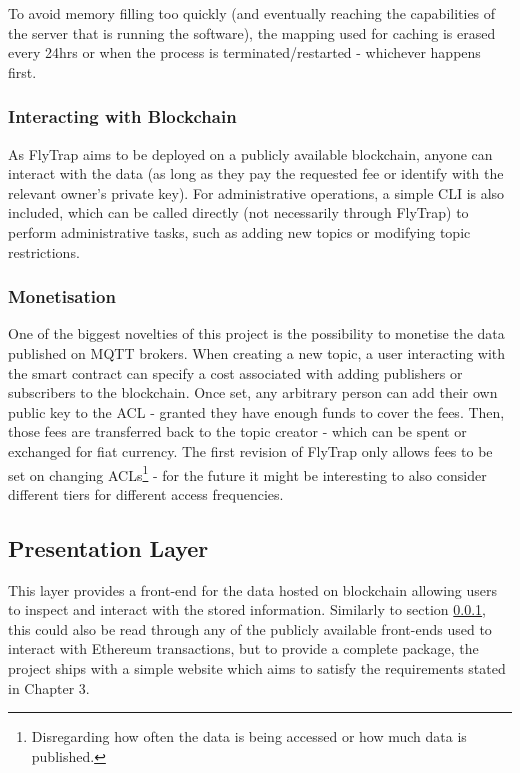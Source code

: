 To avoid memory filling too quickly (and eventually reaching the capabilities of the server that is running the software), the mapping used for caching is erased every 24hrs or when the process is terminated/restarted - whichever happens first.

\subsubsection{Interacting with Blockchain}\label{sec:interact}
As FlyTrap aims to be deployed on a publicly available blockchain, anyone can interact with the data (as long as they pay the requested fee or identify with the relevant owner's private key). For administrative operations, a simple CLI is also included, which can be called directly (not necessarily through FlyTrap) to perform administrative tasks, such as adding new topics or modifying topic restrictions.

\subsubsection{Monetisation}\label{sec:monetization}
One of the biggest novelties of this project is the possibility to monetise the data published on MQTT brokers. When creating a new topic, a user interacting with the smart contract can specify a cost associated with adding publishers or subscribers to the blockchain. Once set, any arbitrary person can add their own public key to the ACL - granted they have enough funds to cover the fees. Then, those fees are transferred back to the topic creator - which can be spent or exchanged for fiat currency. The first revision of FlyTrap only allows fees to be set on changing ACLs\footnote{Disregarding how often the data is being accessed or how much data is published.} - for the future it might be interesting to also consider different tiers for different access frequencies. 

\subsection{Presentation Layer}
This layer provides a front-end for the data hosted on blockchain allowing users to inspect and interact with the stored information. Similarly to section \ref{sec:interact}, this could also be read through any of the publicly available front-ends used to interact with Ethereum transactions, but to provide a complete package, the project ships with a simple website which aims to satisfy the requirements stated in Chapter 3.
